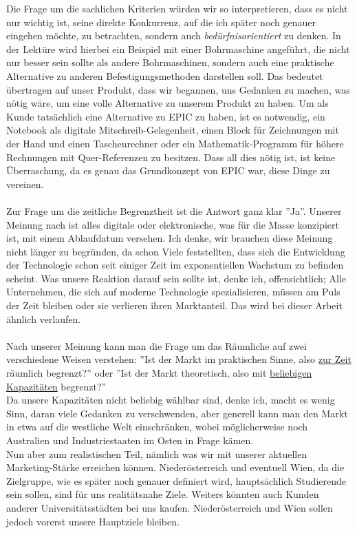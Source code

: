 Die Frage um die sachlichen Kriterien würden wir so interpretieren, dass es nicht nur wichtig ist, seine direkte Konkurrenz, auf die ich später noch genauer eingehen möchte, zu betrachten, sondern auch \textit{bedürfnisorientiert} zu denken. In der Lektüre wird hierbei ein Beispiel mit einer Bohrmaschine angeführt, die nicht nur besser sein sollte als andere Bohrmaschinen, sondern auch eine praktische Alternative zu anderen Befestigungsmethoden darstellen soll. Das bedeutet übertragen auf unser Produkt, dass wir begannen, uns Gedanken zu machen, was nötig wäre, um eine volle Alternative zu unserem Produkt zu haben. Um als Kunde tatsächlich eine Alternative zu EPIC zu haben, ist es notwendig, ein Notebook als digitale Mitschreib-Gelegenheit, einen Block für Zeichnungen mit der Hand und einen Taschenrechner oder ein Mathematik-Programm für höhere Rechnungen mit Quer-Referenzen zu besitzen. Dass all dies nötig ist, ist keine Überraschung, da es genau das Grundkonzept von EPIC war, diese Dinge zu vereinen. \\
\\
Zur Frage um die zeitliche Begrenztheit ist die Antwort ganz klar ''Ja''. Unserer Meinung nach ist alles digitale oder elektronische, was für die Masse konzipiert ist, mit einem Ablaufdatum versehen. Ich denke, wir brauchen diese Meinung nicht länger zu begründen, da schon Viele feststellten, dass sich die Entwicklung der Technologie schon seit einiger Zeit im exponentiellen Wachstum zu befinden scheint. Was unsere Reaktion darauf sein sollte ist, denke ich, offensichtlich; Alle Unternehmen, die sich auf moderne Technologie spezialisieren, müssen am Puls der Zeit bleiben oder sie verlieren ihren Marktanteil. Das wird bei dieser Arbeit ähnlich verlaufen.\\
\\
Nach unserer Meinung kann man die Frage um das Räumliche auf zwei verschiedene Weisen verstehen: ''Ist der Markt im praktischen Sinne, also \underline{zur Zeit} räumlich begrenzt?'' oder ''Ist der Markt theoretisch, also mit \underline{beliebigen Kapazitäten} begrenzt?''\\
Da unsere Kapazitäten nicht beliebig wählbar sind, denke ich, macht es wenig Sinn, daran viele Gedanken zu verschwenden, aber generell kann man den Markt in etwa auf die westliche Welt einschränken, wobei möglicherweise noch Australien und Industriestaaten im Osten in Frage kämen.\\
Nun aber zum realistischen Teil, nämlich was wir mit unserer aktuellen Marketing-Stärke erreichen können. Niederösterreich und eventuell Wien, da die Zielgruppe, wie es später noch genauer definiert wird, hauptsächlich Studierende sein sollen, sind für uns realitätsnahe Ziele. Weiters könnten auch Kunden anderer Universitätsstädten bei uns kaufen. Niederösterreich und Wien sollen jedoch vorerst unsere Hauptziele bleiben.\\

